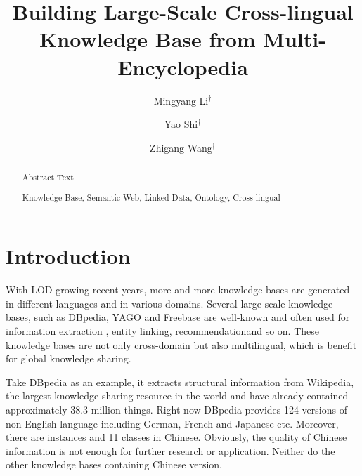 \documentclass[runningheads,a4paper]{llncs}
\newcommand{\keywords}[1]{\par\addvspace\baselineskip\noindent\keywordname\enspace\ignorespaces#1}
\begin{document}
\mainmatter

\title{Building Large-Scale Cross-lingual Knowledge Base from Multi-Encyclopedia}
\author{Mingyang Li$^\dag$ \and Yao Shi$^\dag$ \and Zhigang Wang$^\dag$}


\maketitle

\begin{abstract}
    Abstract Text

\keywords{Knowledge Base, Semantic Web, Linked Data, Ontology, Cross-lingual}
\end{abstract}

\section{Introduction}
With LOD growing recent years, more and more knowledge bases are generated in different languages and in various domains. Several large-scale knowledge bases, such as DBpedia\cite{mendes2012dbpedia}, YAGO\cite{mahdisoltani2014yago3} and Freebase\cite{bollacker2008freebase} are well-known and often used for information extraction \cite{dutta2013integrating}, entity linking\cite{shen2012linden}, recommendation\cite{passant2010dbrec,fernandez2011generic,kaminskas2012knowledge}and so on. These knowledge bases are not only cross-domain but also multilingual, which is benefit for global knowledge sharing. 

Take DBpedia as an example, it extracts structural information from Wikipedia, the largest knowledge sharing resource in the world and have already contained approximately 38.3 million things. Right now DBpedia provides 124 versions of non-English language including German, French and Japanese etc. Moreover, there are instances and 11 classes in Chinese. Obviously, the quality of Chinese information is not enough for further research or application. Neither do the other knowledge bases containing Chinese version. 
\end{document}
